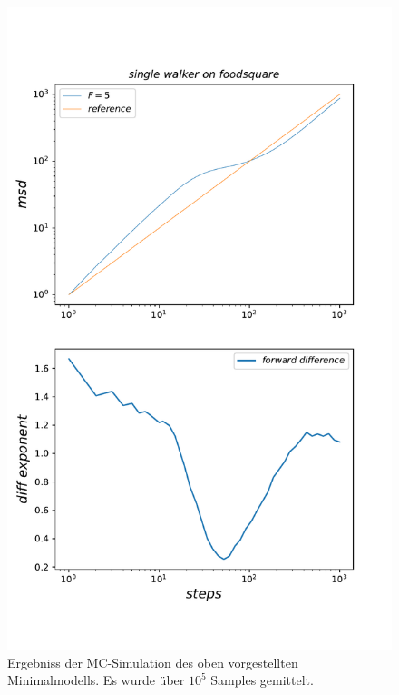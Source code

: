 \documentclass[a4paper, 12pt]{report}
\begin{document}
\begin{figure}[H]
	\centering
	\includegraphics[scale=0.7]{single_walker_on20x20.pdf}
	\caption{Ergebniss der MC-Simulation des oben vorgestellten Minimalmodells. Es wurde über $10^5$ Samples gemittelt.}
\end{figure}
\end{document}
